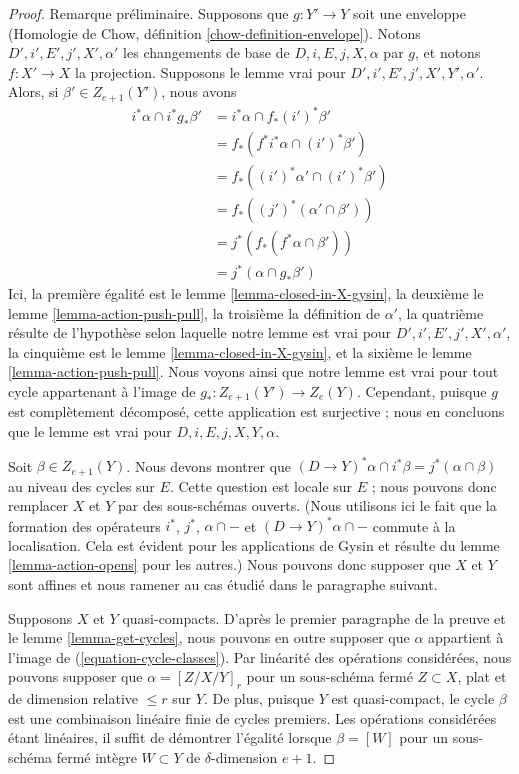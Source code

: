 \begin{proof} 
Remarque préliminaire.
 Supposons que $g : Y' \to Y$ soit une enveloppe (Homologie de Chow, définition 
\ref{chow-definition-envelope}). 
Notons $D', i', E', j', X', \alpha'$ les changements de base de 
$D, i, E, j, X, \alpha$ par $g$, et notons $f : X' \to X$ la projection. 
Supposons le lemme vrai pour $D', i', E', j', X', Y', \alpha'$.
 Alors, si $\beta' \in Z_{e + 1}(Y')$, nous avons 
\begin{align*} 
i^*\alpha \cap i^*g_*\beta'
 & =
 i^*\alpha \cap f_*(i')^*\beta' \\
 & =
 f_*(f^*i^*\alpha \cap (i')^*\beta') \\ 
& =
 f_*((i')^*\alpha' \cap (i')^*\beta') \\ 
& =
 f_*((j')^*(\alpha' \cap \beta')) \\ 
& =
 j^*(f_*(f^*\alpha \cap \beta')) \\ 
& =
 j^*(\alpha \cap g_*\beta') 
\end{align*} 
Ici, la 
première égalité est le lemme \ref{lemma-closed-in-X-gysin},
 la deuxième le lemme \ref{lemma-action-push-pull},
 la troisième la définition de $\alpha'$,
 la quatrième résulte de l'hypothèse selon laquelle notre lemme est vrai pour 
$D', i', E', j', X', \alpha'$,
 la cinquième est le lemme \ref{lemma-closed-in-X-gysin},
 et la sixième le lemme \ref{lemma-action-push-pull}. Nous voyons
 ainsi que notre lemme est vrai pour tout cycle appartenant à l'image de 
$g_* : Z_{e + 1}(Y') \to Z_e(Y)$. Cependant, puisque $g$ est complètement 
décomposé, cette application est surjective ; nous en concluons que le lemme est vrai 
pour $D, i, E, j, X, Y, \alpha$. 

\medskip\noindent
 Soit $\beta \in Z_{e + 1}(Y)$. Nous devons montrer que 
$(D \to Y)^*\alpha \cap i^*\beta = j^*(\alpha \cap \beta)$
 au niveau des cycles sur $E$. Cette question est locale sur $E$ ; nous pouvons
 donc remplacer $X$ et $Y$ par des sous-schémas ouverts. (Nous utilisons ici le fait que la 
formation des opérateurs $i^*$, $j^*$, $\alpha \cap - $ et 
$(D \to Y)^*\alpha \cap -$ commute à la localisation. Cela est 
évident pour les applications de Gysin et résulte du
 lemme \ref{lemma-action-opens} pour les autres.) Nous
 pouvons donc supposer que $X$ et $Y$ sont affines
 et nous ramener au cas étudié dans le paragraphe suivant. 

\medskip\noindent
 Supposons $X$ et $Y$ quasi-compacts. D'après le premier paragraphe de la preuve 
et le lemme \ref{lemma-get-cycles}, nous pouvons en outre supposer que $\alpha$
 appartient à l'image de (\ref{equation-cycle-classes}). Par linéarité 
des opérations considérées, nous pouvons supposer que $\alpha = [Z/X/Y]_r$
 pour un sous-schéma fermé $Z \subset X$, plat et de dimension 
relative $\leq r$ sur $Y$. De plus, puisque $Y$ est quasi-compact, le cycle 
$\beta$ est une combinaison linéaire finie de cycles premiers. Les opérations 
considérées étant linéaires, il suffit de
 démontrer l'égalité lorsque $\beta = [W]$ pour un sous-schéma fermé intègre 
$W \subset Y$ de $\delta$-dimension $e + 1$. 


\end{proof}
